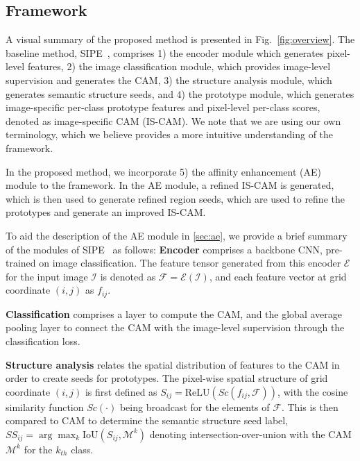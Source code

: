 \documentclass{article}
\begin{document}
\subsection{Framework}
\label{sec:overview}

A visual summary of the proposed method is presented in Fig.~\ref{fig:overview}. 
The baseline method, SIPE~\cite{SIPE}, comprises 1) the encoder module which generates pixel-level features, 2) the image classification module, which provides image-level supervision and generates the CAM, 3) the structure analysis module, which generates semantic structure seeds, and 4) the prototype module, which generates image-specific per-class prototype features and pixel-level per-class scores, denoted as image-specific CAM (IS-CAM). We note that we are using our own terminology, which we believe provides a more intuitive understanding of the framework.

In the proposed method, we incorporate 5) the affinity enhancement (AE) module to the framework. 
In the AE module, a refined IS-CAM is generated, which is then used to generate refined region seeds, which are used to refine the prototypes and generate an improved IS-CAM. 

To aid the description of the AE module in \ref{sec:ae}, we provide a brief summary of the modules of SIPE~\cite{SIPE} as follows:
\noindent
{\bf {Encoder}} comprises a backbone CNN, pre-trained on image classification. 
The feature tensor generated from this encoder $\mathcal{E}$ for the input image $\mathcal {I}$ is denoted as $\mathcal {F} = \mathcal {E}(\mathcal {I})$, and each feature vector at grid coordinate ${(i,j)}$ as $f_{ij}$. 

\noindent
{\bf {Classification}} comprises a layer to compute the CAM, and the global average pooling layer to connect the CAM with the image-level supervision through the classification loss.

\noindent
{\bf {Structure analysis}} relates the spatial distribution of features to the CAM in order to create seeds for prototypes. The pixel-wise spatial structure of grid coordinate ${(i,j)}$ is first defined as $S_{ij} = {\text {ReLU}}(Sc(f_{ij},\mathcal {F}))$, with the cosine similarity function $Sc(\cdot)$ being broadcast for the elements of $\mathcal {F}$. 
This is then compared to CAM to determine the semantic structure seed label, $SS_{ij} = \arg \max_{k} {{\text {IoU}} (S_{ij}, {\mathcal {M}}^{k})}$ denoting intersection-over-union with the CAM ${\mathcal {M}}^{k}$ for the $k_{th}$ class. 
\end{document}
